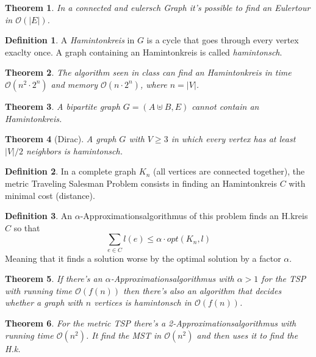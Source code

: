 \documentclass[12pt]{extarticle}
\theoremstyle{definition}
\newtheorem{definition}{Definition}
\theoremstyle{remark}
\theoremstyle{plain}
\newtheorem{theorem}{Theorem}
\theoremstyle{plain}
\theoremstyle{plain}
\newcommand{\BO}{\mathcal{O}}
\begin{document}
\begin{theorem}
    In a connected and eulersch Graph it's possible to find an Eulertour in $\BO(|E|)$.
\end{theorem}

\begin{definition}
    A \textit{Hamintonkreis} in $G$ is a cycle that goes through every vertex exaclty once.
    A graph containing an Hamintonkreis is called \textit{hamintonsch}.
\end{definition}

\begin{theorem}
    The algorithm seen in class can find an Hamintonkreis in time $\BO(n^2 \cdot 2^n)$ and memory $\BO(n \cdot 2^n)$, where $n = |V|$.
\end{theorem}

\begin{theorem}
    A bipartite graph $G = (A \uplus B, E)$ cannot contain an Hamintonkreis.
\end{theorem}

\begin{theorem}[Dirac]
    A graph $G$ with $V \ge 3$ in which every vertex has at least $|V|/2$ neighbors is \textit{hamintonsch}.
\end{theorem}

\begin{definition}
    In a complete graph $K_n$ (all vertices are connected together),
    the metric Traveling Salesman Problem consists in finding an
    Hamintonkreis $C$ with minimal cost (distance).
\end{definition}

\begin{definition}
    An $\alpha$-Approximationsalgorithmus of this problem finds an H.kreis $C$ so that
    \[ \sum_{e \in C} l(e) \le \alpha \cdot opt(K_n, l) \]
    Meaning that it finds a solution worse by the optimal solution by a factor $\alpha$.
\end{definition}

\begin{theorem}
    If there's an $\alpha$-Approximationsalgorithmus with $\alpha > 1$ for the TSP with running time $\BO(f(n))$ then there's
    also an algorithm that decides whether a graph with $n$ vertices is hamintonsch in $\BO(f(n))$.
\end{theorem}
\begin{theorem}
    For the metric TSP there's a 2-Approximationsalgorithmus with running time $\BO(n^2)$.
    It find the MST in $\BO(n^2)$ and then uses it to find the H.k.
\end{theorem}
\end{document}
